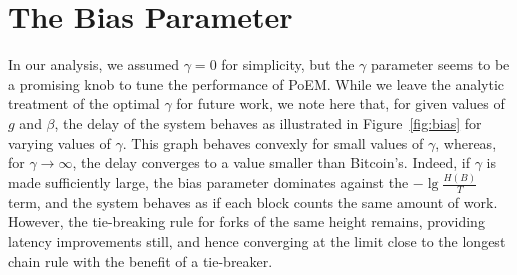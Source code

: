 \section{The Bias Parameter}

In our analysis, we assumed $\gamma = 0$ for simplicity, but the $\gamma$ parameter
seems to be a promising knob to tune the performance of PoEM. While we leave the
analytic treatment of the optimal $\gamma$ for future work, we note here that,
for given values of $g$ and $\beta$, the delay of the system behaves as illustrated
in Figure~\ref{fig:bias} for varying values of $\gamma$. This graph behaves convexly for
small values of $\gamma$, whereas, for $\gamma \to \infty$, the delay converges to
a value smaller than Bitcoin's. Indeed, if $\gamma$ is made sufficiently large, the bias
parameter dominates against the $-\lg\frac{H(B)}{T}$ term, and the system behaves
as if each block counts the same amount of work. However, the tie-breaking rule for forks of the same
height remains, providing latency improvements still, and hence converging at the limit close to the
longest chain rule with the benefit of a tie-breaker.

